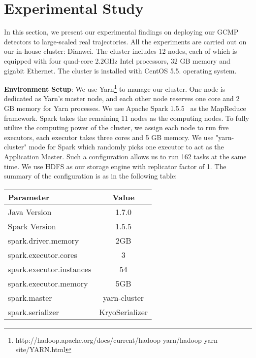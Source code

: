 \section{Experimental Study}
\label{sec:exp}
In this section, we present our experimental findings on
deploying our GCMP detectors to large-scaled real trajectories.
All the experiments are carried out on our in-house cluster: Dianwei. The cluster includes 12 nodes, each of which is equipped with four quad-core 2.2GHz Intel processors, 32 GB memory and gigabit Ethernet. The cluster is installed with CentOS 5.5. operating system.

\textbf{Environment Setup}: We use Yarn\footnote{http://hadoop.apache.org/docs/current/hadoop-yarn/hadoop-yarn-site/YARN.html}
to manage our cluster. One node is dedicated as Yarn's master node, and each other node reserves one core and 2 GB memory for
Yarn processes. We use Apache Spark 1.5.5~\cite{zaharia2012resilient} as the MapReduce framework. Spark takes
the remaining 11 nodes as the computing nodes.
To fully utilize the computing power of the cluster, 
we assign each node to run five executors, each executor takes three cores and 5 GB memory. We use "yarn-cluster" mode
for Spark which randomly picks one executor to act as the Application Master. Such a configuration allows us to run 162 tasks
at the same time. We use HDFS as our storage engine with replicator factor of 1.
The summary of the configuration is as in the following table:


\begin{table} [h]
\centering
\begin{tabular}{|l|c|}
\hline 
Parameter & Value  \\ 
\hline 
Java Version & 1.7.0 \\ 
\hline 
Spark Version & 1.5.5 \\ 
\hline 
spark.driver.memory & 2GB \\ 
\hline 
spark.executor.cores & 3  \\ 
\hline 
spark.executor.instances & 54 \\ 
\hline 
spark.executor.memory & 5GB \\ 
\hline 
spark.master & yarn-cluster \\
\hline 
spark.serializer & KryoSerializer \\ 
\hline 
\end{tabular} 
\end{table}

